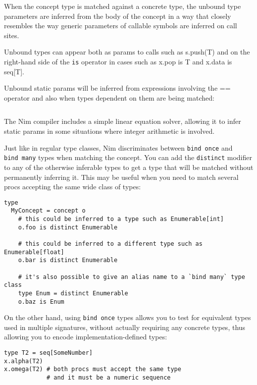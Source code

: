 When the concept type is matched against a concrete type, the unbound
type parameters are inferred from the body of the concept in a way that
closely resembles the way generic parameters of callable symbols are
inferred on call sites.

Unbound types can appear both as params to calls such as {s.push(T)} and
on the right-hand side of the \texttt{is} operator in cases such as
{x.pop is T} and {x.data is seq{[}T{]}}.

Unbound static params will be inferred from expressions involving the
{==} operator and also when types dependent on them are being matched:

\begin{verbatim}
\end{verbatim}

The Nim compiler includes a simple linear equation solver, allowing it
to infer static params in some situations where integer arithmetic is
involved.

Just like in regular type classes, Nim discriminates between
\texttt{bind\ once} and \texttt{bind\ many} types when matching the
concept. You can add the \texttt{distinct} modifier to any of the
otherwise inferable types to get a type that will be matched without
permanently inferring it. This may be useful when you need to match
several procs accepting the same wide class of types:

\begin{verbatim}
type
  MyConcept = concept o
    # this could be inferred to a type such as Enumerable[int]
    o.foo is distinct Enumerable

    # this could be inferred to a different type such as Enumerable[float]
    o.bar is distinct Enumerable

    # it's also possible to give an alias name to a `bind many` type class
    type Enum = distinct Enumerable
    o.baz is Enum
\end{verbatim}

On the other hand, using \texttt{bind\ once} types allows you to test
for equivalent types used in multiple signatures, without actually
requiring any concrete types, thus allowing you to encode
implementation-defined types:

\begin{verbatim}
type T2 = seq[SomeNumber]
x.alpha(T2)
x.omega(T2) # both procs must accept the same type
            # and it must be a numeric sequence
\end{verbatim}

